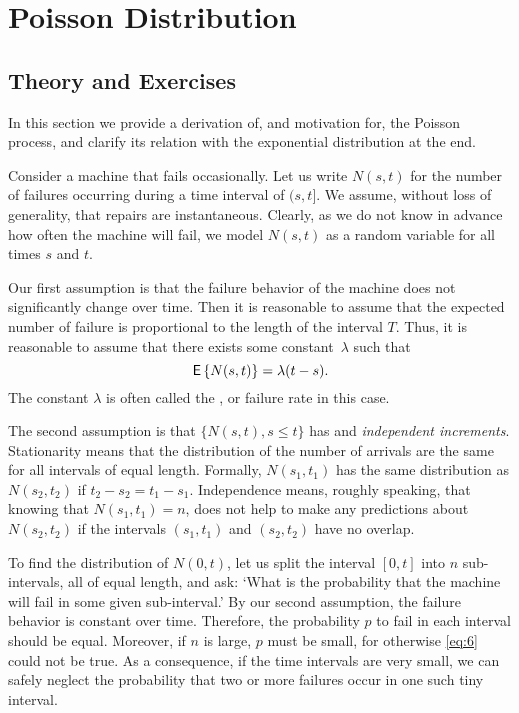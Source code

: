 \section{Poisson Distribution}
\label{sec:poisson-distribution}

\subsection*{Theory and Exercises}



In this section we provide a derivation of, and motivation for, the
Poisson process, and clarify its relation with the exponential
distribution at the end.

Consider a machine that fails occasionally. Let us write $N(s, t)$ for
the number of failures occurring during a time interval of $(s,t]$. We
assume, without loss of generality, that repairs are
instantaneous. Clearly, as we do not know in advance how often the
machine will fail, we model $N(s,t)$ as a random variable for all
times $s$ and $t$.

Our first assumption is that the failure behavior of the machine does not
significantly change over time. Then it is reasonable to assume that
the expected number of failure is proportional to the  length of
the interval $T$. Thus, it is reasonable to assume that there exists some
constant~$\lambda$ such that
\begin{equation}
  \label{eq:6}
 \,\mathsf{E}\left\{N(s,t)\right\} = \lambda (t-s).
\end{equation}
The constant $\lambda$ is often called the , or
failure rate in this case.


The second assumption is that $\{N(s,t), s\leq t\}$ has
 and \emph{independent increments}. Stationarity
means that the distribution of the number of arrivals are the same for
all intervals of equal length. Formally, $N(s_1,t_1)$ has the same
distribution as $N(s_2, t_2)$ if $t_2-s_2 = t_1-s_1$. Independence
means, roughly speaking, that knowing that $N(s_1,t_1)= n$, does not
help to make any predictions about $N(s_2, t_2)$ if the intervals
$(s_1,t_1)$ and $(s_2, t_2)$ have no overlap.

To find the distribution of $N(0,t)$, let us split the interval
$[0,t]$ into $n$ sub-intervals, all of equal length, and ask: `What is
the probability that the machine will fail in some given
sub-interval.'  By our second assumption, the failure behavior is
constant over time. Therefore, the probability $p$ to fail in each
interval should be equal. Moreover, if $n$ is large, $p$ must be
small, for otherwise \eqref{eq:6} could not be true. As a consequence,
if the time intervals are very small, we can safely neglect the
probability that two or more failures occur in one such tiny interval.

